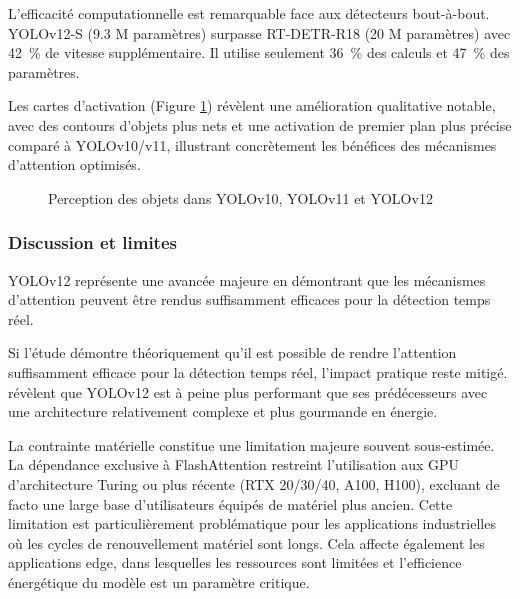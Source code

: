 L'efficacité computationnelle est remarquable face aux détecteurs bout-à-bout. YOLOv12-S (9.3 M paramètres) surpasse RT-DETR-R18 \cite{zhao_detrs_2024} (20 M paramètres) avec 42~\% de vitesse supplémentaire. Il utilise seulement 36~\% des calculs et 47~\% des paramètres.

Les cartes d'activation (Figure \ref{fig:ch2_yolo_10_perception}) révèlent une amélioration qualitative notable, avec des contours d'objets plus nets et une activation de premier plan plus précise comparé à YOLOv10/v11, illustrant concrètement les bénéfices des mécanismes d'attention optimisés.

\begin{figure}[H]
    \centering
    \caption{Perception des objets dans YOLOv10, YOLOv11 et YOLOv12 \cite{tian_yolov12_2025}}
    \label{fig:ch2_yolo_10_perception}
\end{figure}

\subsubsection{Discussion et limites}
YOLOv12 représente une avancée majeure en démontrant que les mécanismes d'attention peuvent être rendus suffisamment efficaces pour la détection temps réel.

Si l'étude démontre théoriquement qu'il est possible de rendre l'attention suffisamment efficace pour la détection temps réel, l'impact pratique reste mitigé. \citeauthor{khanam_review_2025} \cite{khanam_review_2025} révèlent que YOLOv12 est à peine plus performant que ses prédécesseurs avec une architecture relativement complexe et plus gourmande en énergie.

La contrainte matérielle constitue une limitation majeure souvent sous-estimée. La dépendance exclusive à FlashAttention restreint l'utilisation aux GPU d'architecture Turing ou plus récente (RTX 20/30/40, A100, H100), excluant de facto une large base d'utilisateurs équipés de matériel plus ancien. Cette limitation est particulièrement problématique pour les applications industrielles où les cycles de renouvellement matériel sont longs. Cela affecte également les applications edge, dans lesquelles les ressources sont limitées et l'efficience énergétique du modèle est un paramètre critique.

